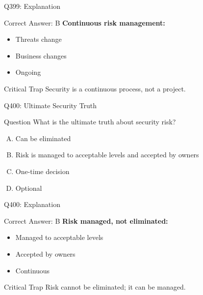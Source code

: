 \documentclass{beamer}
\begin{document}
	\begin{frame}{Q399: Explanation}
		\begin{block}{Correct Answer: B}
			\textbf{Continuous risk management:}
			\begin{itemize}
				\item Threats change
				\item Business changes
				\item Ongoing
			\end{itemize}
		\end{block}
		\begin{alertblock}{Critical Trap}
			Security is a continuous process, not a project.
		\end{alertblock}
	\end{frame}
	
	\begin{frame}{Q400: Ultimate Security Truth}
		\begin{block}{Question}
			What is the ultimate truth about security risk?
		\end{block}
		\begin{enumerate}[(A)]
			\item Can be eliminated
			\item Risk is managed to acceptable levels and accepted by owners
			\item One-time decision
			\item Optional
		\end{enumerate}
	\end{frame}
	
	\begin{frame}{Q400: Explanation}
		\begin{block}{Correct Answer: B}
			\textbf{Risk managed, not eliminated:}
			\begin{itemize}
				\item Managed to acceptable levels
				\item Accepted by owners
				\item Continuous
			\end{itemize}
		\end{block}
		\begin{alertblock}{Critical Trap}
			Risk cannot be eliminated; it can be managed.
		\end{alertblock}
	\end{frame}
	
\end{document}
